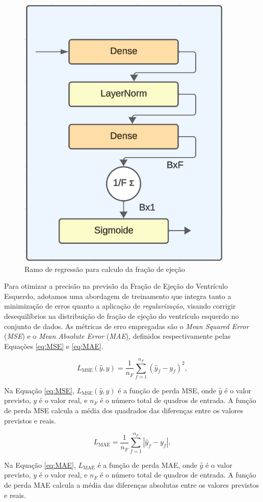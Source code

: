 \begin{figure}
    \centering
    \includegraphics[width=0.5\linewidth]{reg02.png}
    \caption{Ramo de regressão para calculo da fração de ejeção}
    \label{fig:fraceject}
\end{figure}


Para otimizar a precisão na previsão da Fração de Ejeção do Ventrículo Esquerdo, adotamos uma abordagem de treinamento que integra tanto a minimização de erros quanto a aplicação de \textit{regularização}, visando corrigir desequilíbrios na distribuição de fração de ejeção do ventrículo esquerdo no conjunto de dados. As métricas de erro empregadas são o \textit{Mean Squared Error} (\textit{MSE}) e o \textit{Mean Absolute Error} (\textit{MAE}), definidos respectivamente pelas Equações \ref{eq:MSE} e \ref{eq:MAE}.

\begin{equation}
L_{\text{MSE}}(\hat{y}, y) = \frac{1}{n_F} \sum_{f=1}^{n_F} (\hat{y}_f - y_f)^2,
\label{eq:MSE}
\end{equation}

Na Equação \ref{eq:MSE}, \(L_{\text{MSE}}(\hat{y}, y)\) é a função de perda MSE, onde \(\hat{y}\) é o valor previsto, \(y\) é o valor real, e \(n_F\) é o número total de quadros de entrada. A função de perda MSE calcula a média dos quadrados das diferenças entre os valores previstos e reais.

\begin{equation}
L_{\text{MAE}} = \frac{1}{n_F} \sum_{f=1}^{n_F} \left| \hat{y}_f - y_f \right|,
\label{eq:MAE}
\end{equation}

Na Equação \ref{eq:MAE}, \(L_{\text{MAE}}\) é a função de perda MAE, onde \(\hat{y}\) é o valor previsto, \(y\) é o valor real, e \(n_F\) é o número total de quadros de entrada. A função de perda MAE calcula a média das diferenças absolutas entre os valores previstos e reais.


